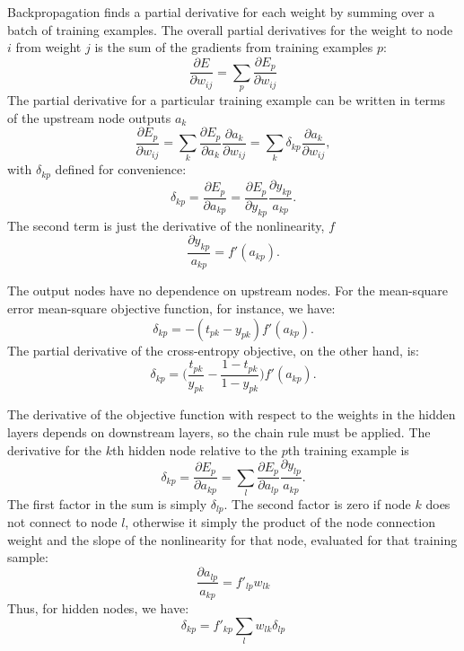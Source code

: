 Backpropagation finds a partial derivative for each weight by summing over a batch of training examples.  The overall partial derivatives for the weight to node $i$ from weight $j$ is the sum of the gradients from training examples $p$:
\begin{equation}
\frac{\partial E}{\partial w_{ij}} = \sum_p \frac{\partial E_p}{\partial w_{ij}}
\end{equation}
The partial derivative for a particular training example can be written in terms of the upstream node outputs $a_k$
\begin{equation}
\frac{\partial E_p}{\partial w_{ij}} =
\sum_k \frac{\partial E_p}{\partial a_k} \frac{\partial a_k}{\partial w_{ij}} =
\sum_k \delta_{kp} \frac{\partial a_k}{\partial w_{ij}},
\end{equation}
with $\delta_{kp}$ defined for convenience:
\begin{equation}
\delta_{kp} = \frac{\partial E_p}{\partial a_{kp}} = \frac{\partial E_p}{\partial y_{kp}}\frac{\partial y_{kp}}{a_{kp}}.
\end{equation}
The second term is just the derivative of the nonlinearity, $f$
\begin{equation}
\frac{\partial y_{kp}}{a_{kp}} = f'(a_{kp}).
\end{equation}

The output nodes have no dependence on upstream nodes.  For the mean-square error mean-square objective function, for instance, we have:
\begin{equation}
\delta_{kp} = -(t_{pk} - y_{pk})f'(a_{kp}).
\end{equation}
The partial derivative of the cross-entropy objective, on the other hand, is:
\begin{equation}
\delta_{kp} = \bigg(\frac{t_{pk}}{y_{pk}}- \frac{1-t_{pk}}{1-y_{pk}}\bigg)f'(a_{kp}).
\end{equation}

The derivative of the objective function with respect to the weights in the hidden layers depends on downstream layers, so the chain rule must be applied.  The derivative for the $k$th hidden node relative to the $p$th training example is
\begin{equation}
\delta_{kp} = \frac{\partial E_p}{\partial a_{kp}} = \sum_l \frac{\partial E_p}{\partial a_{lp}}\frac{\partial y_{lp}}{a_{kp}}.
\end{equation}
The first factor in the sum is simply $\delta_{lp}$.  The second factor is zero if node $k$ does not connect to node $l$, otherwise it simply the product of the node connection weight and the slope of the nonlinearity for that node, evaluated for that training sample:
\begin{equation}
\frac{\partial a_{lp}}{a_{kp}} = f'_{lp} w_{lk}
\end{equation}
Thus, for hidden nodes, we have:
\begin{equation}
\delta_{kp} = f'_{kp} \sum_l w_{lk}\delta_{lp}
\end{equation}

